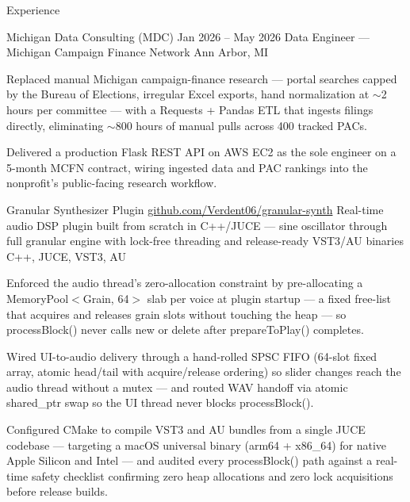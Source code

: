 \documentclass[
	11pt
]{../../../template}
\begin{document}
	\begin{rSection}{E}{xperience}
		\begin{rSectionEntry}
			{Michigan Data Consulting (MDC)}
			{Jan 2026 -- May 2026}
			{Data Engineer --- Michigan Campaign Finance Network}
			{}
			{Ann Arbor, MI}

			\item Replaced manual Michigan campaign-finance research --- portal searches capped by the Bureau of Elections, irregular Excel exports, hand normalization at $\sim$2 hours per committee --- with a Requests + Pandas ETL that ingests filings directly, eliminating $\sim$800 hours of manual pulls across 400 tracked PACs.
			\item Delivered a production Flask REST API on AWS EC2 as the sole engineer on a 5-month MCFN contract, wiring ingested data and PAC rankings into the nonprofit's public-facing research workflow.
		\end{rSectionEntry}

		\begin{rSectionEntry}
			{Granular Synthesizer Plugin}
			{\href{https://github.com/Verdent06/granular-synth}{github.com/Verdent06/granular-synth}}
			{Real-time audio DSP plugin built from scratch in C++/JUCE --- sine oscillator through full granular engine with lock-free threading and release-ready VST3/AU binaries}
			{C++, JUCE, VST3, AU}
			{}

			\item Enforced the audio thread's zero-allocation constraint by pre-allocating a MemoryPool$<$Grain, 64$>$ slab per voice at plugin startup --- a fixed free-list that acquires and releases grain slots without touching the heap --- so processBlock() never calls new or delete after prepareToPlay() completes.
			\item Wired UI-to-audio delivery through a hand-rolled SPSC FIFO (64-slot fixed array, atomic head/tail with acquire/release ordering) so slider changes reach the audio thread without a mutex --- and routed WAV handoff via atomic shared\_ptr swap so the UI thread never blocks processBlock().
			\item Configured CMake to compile VST3 and AU bundles from a single JUCE codebase --- targeting a macOS universal binary (arm64 + x86\_64) for native Apple Silicon and Intel --- and audited every processBlock() path against a real-time safety checklist confirming zero heap allocations and zero lock acquisitions before release builds.
		\end{rSectionEntry}


\end{rSection}
\end{document}
